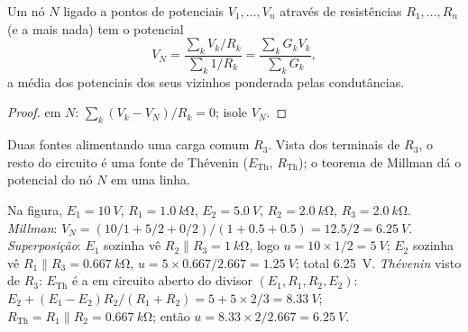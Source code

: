 \begin{proposition}\label{prop:b1:dc-circuits:millman}
Um nó $N$ ligado a pontos de potenciais $V_1, \dots, V_n$ através de
resistências $R_1, \dots, R_n$ (e a mais nada) tem o potencial
\[
V_N = \frac{\sum_k V_k/R_k}{\sum_k 1/R_k} = \frac{\sum_k G_k V_k}{\sum_k G_k},
\]
a média dos potenciais dos seus vizinhos ponderada pelas condutâncias.
\end{proposition}

\begin{proof}
 em $N$: $\sum_k (V_k - V_N)/R_k = 0$; isole $V_N$.
\end{proof}

\begin{omfigure}

{\small Duas fontes alimentando uma carga comum $R_3$. Vista dos
terminais de $R_3$, o resto do circuito é uma fonte de Thévenin
($E_{\mathrm{Th}}$, $R_{\mathrm{Th}}$); o teorema de Millman dá o
potencial do nó $N$ em uma linha.}
\end{omfigure}

\begin{example}\label{ex:b1:dc-circuits:threeways}
Na figura, $E_1 = \qty{10}{V}$, $R_1 = \qty{1.0}{k\ohm}$, $E_2 =
\qty{5.0}{V}$, $R_2 = \qty{2.0}{k\ohm}$, $R_3 = \qty{2.0}{k\ohm}$.
\emph{Millman}: $V_N = (10/1 + 5/2 + 0/2)/(1 + 0.5 + 0.5) = 12.5/2 =
\qty{6.25}{V}$. \emph{Superposição}: $E_1$ sozinha vê $R_2 \parallel
R_3 = \qty{1}{k\ohm}$, logo $u = 10 \times 1/2 = \qty{5}{V}$; $E_2$ sozinha
vê $R_1 \parallel R_3 = \qty{0.667}{k\ohm}$, $u = 5 \times 0.667/2.667
= \qty{1.25}{V}$; total \qty{6.25}{V}. \emph{Thévenin} visto de
$R_3$: $E_{\mathrm{Th}}$ é a  em circuito aberto do divisor
$(E_1, R_1, R_2, E_2)$: $E_2 + (E_1 - E_2)R_2/(R_1 + R_2) = 5 + 5 \times
2/3 = \qty{8.33}{V}$; $R_{\mathrm{Th}} = R_1 \parallel R_2 =
\qty{0.667}{k\ohm}$; então $u = 8.33 \times 2/2.667 = \qty{6.25}{V}$.
\end{example}

